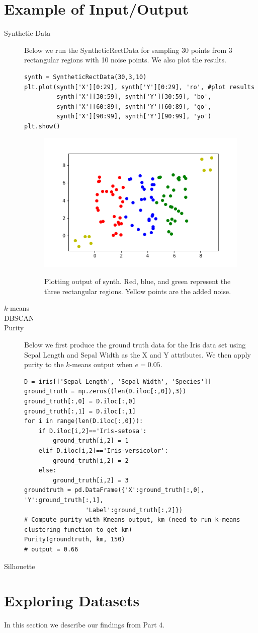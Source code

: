 \documentclass[psamsfonts,onesided,10pt]{amsart}
\begin{document}
\section{Example of Input/Output}
\begin{description}
\item[Synthetic Data] Below we run the SyntheticRectData for sampling 30 points from 3 
rectangular regions with 10 noise points. We also plot the results.
\begin{verbatim}
synth = SyntheticRectData(30,3,10)
plt.plot(synth['X'][0:29], synth['Y'][0:29], 'ro', #plot results
         synth['X'][30:59], synth['Y'][30:59], 'bo', 
         synth['X'][60:89], synth['Y'][60:89], 'go',
         synth['X'][90:99], synth['Y'][90:99], 'yo')
plt.show()   
\end{verbatim}
\begin{figure}[H]
    \centering
    {\includegraphics[width=.4\textwidth]{images/synth.png}} \\
    \caption{Plotting output of synth. Red, blue, and green represent the three rectangular regions. 
Yellow points are the added noise.}
\end{figure}
\item[$k$-means] \todo{}
\item[DBSCAN] \todo{}
\item[Purity] Below we first produce the ground truth data for the Iris data set using Sepal Length 
and Sepal Width as the X and Y attributes. We then apply purity to the $k$-means output when $e=0.05$. 
\begin{verbatim}
D = iris[['Sepal Length', 'Sepal Width', 'Species']]
ground_truth = np.zeros((len(D.iloc[:,0]),3))
ground_truth[:,0] = D.iloc[:,0]
ground_truth[:,1] = D.iloc[:,1]
for i in range(len(D.iloc[:,0])):
    if D.iloc[i,2]=='Iris-setosa':
        ground_truth[i,2] = 1
    elif D.iloc[i,2]=='Iris-versicolor':
        ground_truth[i,2] = 2
    else:
        ground_truth[i,2] = 3
groundtruth = pd.DataFrame({'X':ground_truth[:,0], 'Y':ground_truth[:,1], 
                 'Label':ground_truth[:,2]})       
# Compute purity with Kmeans output, km (need to run k-means clustering function to get km)
Purity(groundtruth, km, 150)
# output = 0.66
\end{verbatim}
\item[Silhouette] \todo{}
\end{description}

\section{Exploring Datasets}
In this section we describe our findings from Part 4. \todo{}
\end{document}
